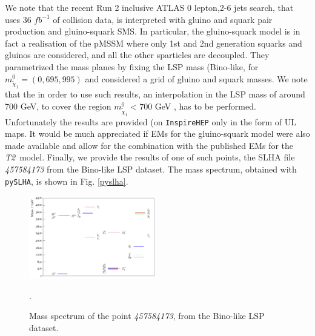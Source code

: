 \documentclass[preprint,number,sort&compress,twocolumn,3p]{elsstyarticle}
\newcommand{\Ttwo}{ \textit{T2}}
\begin{document}
%
We note that the recent Run 2 inclusive ATLAS 0 lepton,2-6 jets search\cite{Aaboud:2017vwy}, that uses 36 $fb^{-1}$ of collision data, is interpreted with gluino and squark pair production and gluino-squark SMS. In particular, the gluino-squark model is in fact a realisation of the pMSSM where only 1st and 2nd generation squarks and gluinos are considered, and all the other sparticles are decoupled. They parametrized the mass planes by fixing the LSP mass (Bino-like, for $m_{\tilde \chi _1} ^0 = (0,695,995)$ and considered a grid of gluino and squark masses. We note that the in order to use such results, an interpolation in the LSP mass of around 700 GeV, to cover the region $m_{\tilde \chi _1} ^0 < 700$ GeV , has to be performed. Unfortunately the results are provided (on \texttt{InspireHEP}\cite{HEP201607} only in the form of UL maps. It would be much appreciated if EMs for the gluino-squark model were also made available and allow for the combination with the published EMs for the \Ttwo~model. 
%
Finally, we provide the results of one of such points, the SLHA file \textit{457584173} from the Bino-like LSP dataset. The mass spectrum, obtained with \texttt{pySLHA}, is shown in Fig. \ref{pyslha}.
\begin{figure}
	\begin{center}
		
		\includegraphics[width=0.49\textwidth]{PLOTS/13TeV/457584173_pyslha.pdf}
		
	\end{center}
	\caption{Mass spectrum of the point \textit{457584173}, from the Bino-like LSP dataset.}. 
	\label{13TeVrvalue}
\end{figure}
\end{document}
